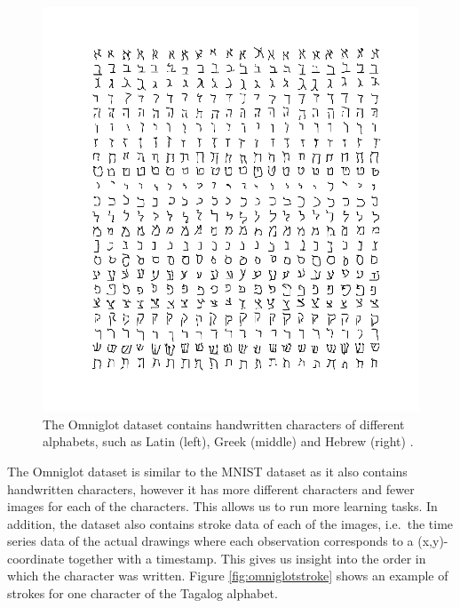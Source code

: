 \begin{figure}[h]
\begin{minipage}{.32\textwidth}
\end{minipage}
\begin{minipage}{.32\textwidth}
  \centering
  \includegraphics[width=\linewidth]{images/hebrew}
\end{minipage}
\caption{The Omniglot dataset contains handwritten characters of different alphabets, such as Latin (left), Greek (middle) and Hebrew (right) \cite{Lake1332}.}
\label{fig:omniglotcharacters}
\end{figure}

The Omniglot dataset is similar to the MNIST dataset as it also contains handwritten characters, however it has more different characters and fewer images for each of the characters. This allows us to run more learning tasks. In addition, the dataset also contains stroke data of each of the images, i.e.\ the time series data of the actual drawings where each observation corresponds to a (x,y)-coordinate together with a timestamp. This gives us insight into the order in which the character was written. Figure \ref{fig:omniglotstroke} shows an example of strokes for one character of the Tagalog alphabet.

